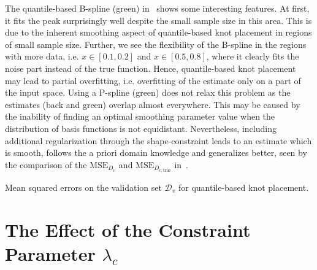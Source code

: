 The quantile-based B-spline (green) in~ shows some interesting features. At first, it fits the peak surprisingly well despite the small sample size in this area. This is due to the inherent smoothing aspect of quantile-based knot placement in regions of small sample size. Further, we see the flexibility of the B-spline in the regions with more data, i.e. $x\in[0.1,0.2]$ and $x \in [0.5,0.8]$, where it clearly fits the noise part instead of the true function. Hence, quantile-based knot placement may lead to partial overfitting, i.e. overfitting of the estimate only on a part of the input space. Using a P-spline (green) does not relax this problem as the estimates (back and green) overlap almost everywhere. This may be caused by the inability of finding an optimal smoothing parameter value when the distribution of basis functions is not equidistant. Nevertheless, including additional regularization through the shape-constraint leads to an estimate which is smooth, follows the a priori domain knowledge and generalizes better, seen by the comparison of the $\text{MSE}_{D_v}$ and $\text{MSE}_{D_{v, \mathrm{true}}}$ in~.


\begin{table}[H]
	\begin{center}
	\end{center}
	\caption{Mean squared errors on the validation set $\mathcal{D}_v$ for quantile-based knot placement.}
	\label{tab:sparse-example-quantile}
\end{table}



\section{The Effect of the Constraint Parameter $\lambda_c$} \label{sec:lambda_c_sec}

